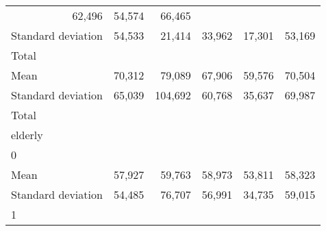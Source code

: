 \begin{tabular}{llllll}
  \multicolumn{1}{r}{62,496} &
  \multicolumn{1}{r}{54,574} &
  \multicolumn{1}{r}{66,465} \\
\multicolumn{1}{l}{\hspace{4em}Standard deviation} &
  \multicolumn{1}{|r}{54,533} &
  \multicolumn{1}{r}{21,414} &
  \multicolumn{1}{r}{33,962} &
  \multicolumn{1}{r}{17,301} &
  \multicolumn{1}{r}{53,169} \\
\multicolumn{1}{l}{\hspace{3em}Total} &
  \multicolumn{1}{|r}{} &
  \multicolumn{1}{r}{} &
  \multicolumn{1}{r}{} &
  \multicolumn{1}{r}{} &
  \multicolumn{1}{r}{} \\
\multicolumn{1}{l}{\hspace{4em}Mean} &
  \multicolumn{1}{|r}{70,312} &
  \multicolumn{1}{r}{79,089} &
  \multicolumn{1}{r}{67,906} &
  \multicolumn{1}{r}{59,576} &
  \multicolumn{1}{r}{70,504} \\
\multicolumn{1}{l}{\hspace{4em}Standard deviation} &
  \multicolumn{1}{|r}{65,039} &
  \multicolumn{1}{r}{104,692} &
  \multicolumn{1}{r}{60,768} &
  \multicolumn{1}{r}{35,637} &
  \multicolumn{1}{r}{69,987} \\
\multicolumn{1}{l}{\hspace{1em}Total} &
  \multicolumn{1}{|r}{} &
  \multicolumn{1}{r}{} &
  \multicolumn{1}{r}{} &
  \multicolumn{1}{r}{} &
  \multicolumn{1}{r}{} \\
\multicolumn{1}{l}{\hspace{2em}elderly} &
  \multicolumn{1}{|r}{} &
  \multicolumn{1}{r}{} &
  \multicolumn{1}{r}{} &
  \multicolumn{1}{r}{} &
  \multicolumn{1}{r}{} \\
\multicolumn{1}{l}{\hspace{3em}0} &
  \multicolumn{1}{|r}{} &
  \multicolumn{1}{r}{} &
  \multicolumn{1}{r}{} &
  \multicolumn{1}{r}{} &
  \multicolumn{1}{r}{} \\
\multicolumn{1}{l}{\hspace{4em}Mean} &
  \multicolumn{1}{|r}{57,927} &
  \multicolumn{1}{r}{59,763} &
  \multicolumn{1}{r}{58,973} &
  \multicolumn{1}{r}{53,811} &
  \multicolumn{1}{r}{58,323} \\
\multicolumn{1}{l}{\hspace{4em}Standard deviation} &
  \multicolumn{1}{|r}{54,485} &
  \multicolumn{1}{r}{76,707} &
  \multicolumn{1}{r}{56,991} &
  \multicolumn{1}{r}{34,735} &
  \multicolumn{1}{r}{59,015} \\
\multicolumn{1}{l}{\hspace{3em}1} &

\end{tabular}
